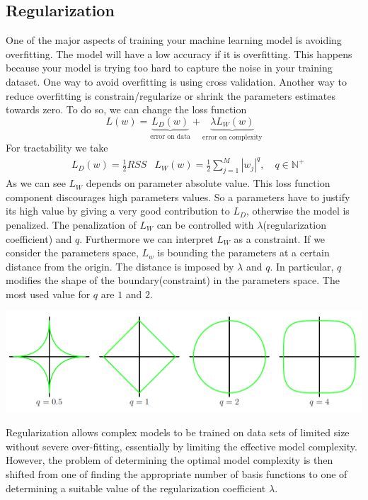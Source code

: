 \documentclass[main.tex]{subfiles}
\begin{document}
\subsection{Regularization}
One of the major aspects of training your machine learning model is avoiding overfitting. The model will have a low accuracy if it is overfitting. This happens because your model is trying too hard to capture the noise in your training dataset. One way to avoid overfitting is using cross validation. Another way to reduce overfitting is constrain/regularize or shrink the parameters estimates towards zero. To do so, we can change the loss function
\begin{equation}
    L(w)=\underbrace{L_D(w)}_{\text{error on data}}+ \underbrace{\lambda L_W(w)}_{\text{error on complexity}}
\end{equation}
For tractability we take
\begin{align*}
   & L_D(w)=\frac{1}{2}RSS &L_W(w)=\frac{1}{2}\sum_{j=1}^M |w_j|^q, \quad q\in\mathbb{N}^+
\end{align*}
As we can see $L_W$ depends on parameter absolute value. This loss function component discourages high parameters values. So a parameters have to justify its high value by giving a very good contribution to $L_D$, otherwise the model is penalized.
The penalization of $L_W$ can be controlled with $\lambda$(regularization coefficient) and $q$.
Furthermore we can interpret $L_W$ as a constraint. If we consider the parameters space, $L_w$ is bounding the parameters at a certain distance from the origin. The distance is imposed by $\lambda$ and $q$. In particular, $q$ modifies the shape of the boundary(constraint) in the parameters space.
The most used value for $q$ are $1$ and $2$.
\begin{center}
    \includegraphics[scale=0.4]{img/Q_boundaries_regularization.PNG}
\end{center}
Regularization allows complex models to be trained on data sets of limited size
without severe over-fitting, essentially by limiting the effective model complexity.
However, the problem of determining the optimal model complexity is then shifted
from one of finding the appropriate number of basis functions to one of determining
a suitable value of the regularization coefficient $\lambda$.
\end{document}
